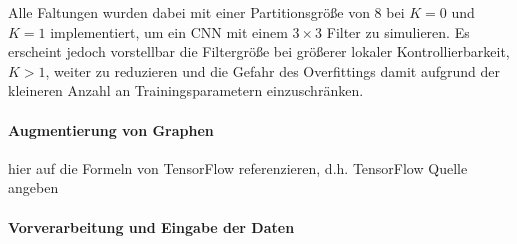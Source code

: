 Alle Faltungen wurden dabei mit einer Partitionsgröße von $8$ bei $K=0$ und $K=1$ implementiert, um ein \gls{CNN} mit einem $3 \times 3$ Filter zu simulieren.
Es erscheint jedoch vorstellbar die Filtergröße bei größerer lokaler Kontrollierbarkeit, \dhe{} $K > 1$, weiter zu reduzieren und die Gefahr des Overfittings damit aufgrund der kleineren Anzahl an Trainingsparametern einzuschränken.

\paragraph{Augmentierung von Graphen}
\label{augmentierung_von_graphen}

hier auf die Formeln von TensorFlow referenzieren, d.h. TensorFlow Quelle angeben
\cite{tensorflow}

\paragraph{Vorverarbeitung und Eingabe der Daten}
\label{vorverarbeitung}
